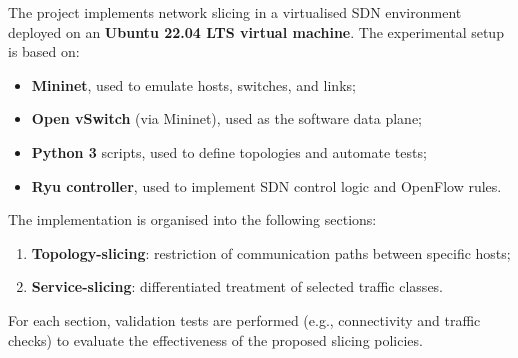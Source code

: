 The project implements network slicing in a virtualised SDN environment deployed on an \textbf{Ubuntu 22.04 LTS virtual machine}.  
The experimental setup is based on:
\begin{itemize}
    \item \textbf{Mininet}, used to emulate hosts, switches, and links;
    \item \textbf{Open vSwitch} (via Mininet), used as the software data plane;
    \item \textbf{Python 3} scripts, used to define topologies and automate tests;
    \item \textbf{Ryu controller}, used to implement SDN control logic and OpenFlow rules.
\end{itemize}

The implementation is organised into the following sections:
\begin{enumerate}
    \item \textbf{Topology-slicing}: restriction of communication paths between specific hosts;
    \item \textbf{Service-slicing}: differentiated treatment of selected traffic classes.
\end{enumerate}

\noindent
For each section, validation tests are performed (e.g., connectivity and traffic checks) to evaluate the effectiveness of the proposed slicing policies.